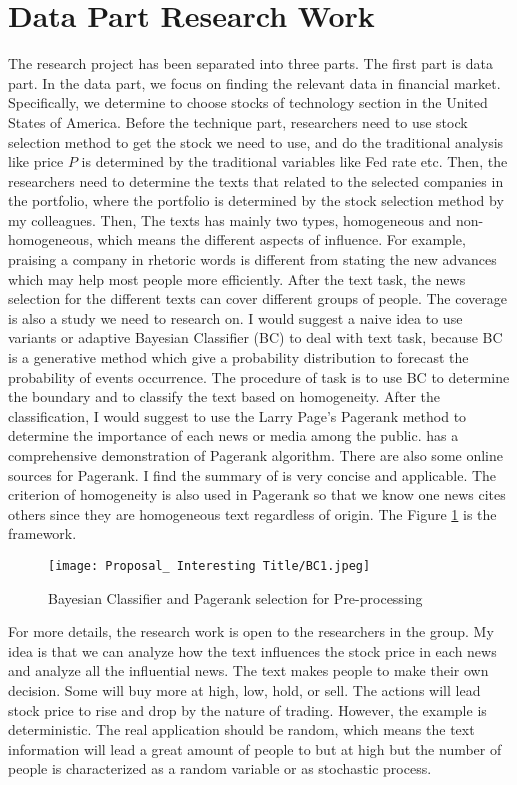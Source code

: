 \documentclass[12pt]{article}
\begin{document}
\section{Data Part Research Work}
\label{data}
The research project has been separated into three parts. The first part is data part. In the data part, we focus on finding the relevant data in financial market. Specifically, we determine to choose stocks of technology section in the United States of America. Before the technique part, researchers need to use stock selection method to get the stock we need to use, and do the traditional analysis like price $P$ is determined by the traditional variables like Fed rate etc. Then, the researchers need to determine the texts that related to the selected companies in the portfolio, where the portfolio is determined by the stock selection method by my colleagues. Then, The texts has mainly two types, homogeneous and non-homogeneous, which means the different aspects of influence. For example, praising a company in rhetoric words is different from stating the new advances which may help most people more efficiently. After the text task, the news selection for the different texts can cover different groups of people. The coverage is also a study we need to research on. I would suggest a naive idea to use variants or adaptive Bayesian Classifier (BC) to deal with text task, because BC is a generative method which give a probability distribution to forecast the probability of events occurrence. The procedure of task is to use BC to determine the boundary and to classify the text based on homogeneity. After the classification, I would suggest to use the Larry Page's Pagerank method to determine the importance of each news or media among the public. \citet{Page1999ThePC} has a comprehensive demonstration of Pagerank algorithm. There are also some online sources for Pagerank. I find the summary of \citet{Austin_2006} is very concise and applicable. The criterion of homogeneity is also used in Pagerank so that we know one news cites others since they are homogeneous text regardless of origin. The Figure \ref{fig:BC1} is the framework. 
\begin{figure}
    \centering
    \texttt{[image: Proposal\_ Interesting Title/BC1.jpeg]}
    \caption{Bayesian Classifier and Pagerank selection for Pre-processing}
    \label{fig:BC1}
\end{figure}

For more details, the research work is open to the researchers in the group. My idea is that we can analyze how the text influences the stock price in each news and analyze all the influential news. The text makes people to make their own decision. Some will buy more at high, low, hold, or sell. The actions will lead stock price to rise and drop by the nature of trading. However, the example is deterministic. The real application should be random, which means the text information will lead a great amount of people to but at high but the number of people is characterized as a random variable or as stochastic process. 
\end{document}
